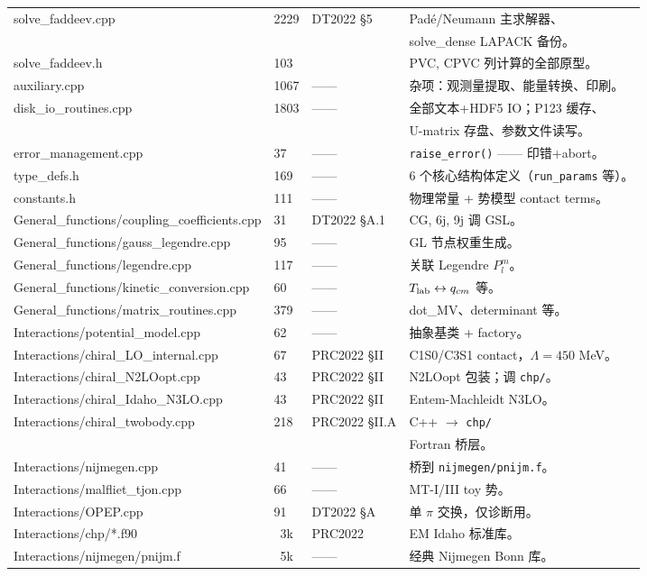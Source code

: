\begin{longtable}{p{3.6cm}p{1.0cm}p{2.4cm}p{6cm}}
solve\_faddeev.cpp             & 2229 & DT2022 §5    & Padé/Neumann 主求解器、\\
                               &      &              & solve\_dense LAPACK 备份。 \\
solve\_faddeev.h               & 103  &              & PVC, CPVC 列计算的全部原型。 \\
auxiliary.cpp                  & 1067 & ——           & 杂项：观测量提取、能量转换、印刷。\\
disk\_io\_routines.cpp         & 1803 & ——           & 全部文本+HDF5 IO；P123 缓存、\\
                               &      &              & U-matrix 存盘、参数文件读写。 \\
error\_management.cpp          & 37   & ——           & \texttt{raise\_error()} —— 印错+abort。 \\
type\_defs.h                   & 169  & ——           & 6 个核心结构体定义（\texttt{run\_params} 等）。 \\
constants.h                    & 111  & ——           & 物理常量 + 势模型 contact terms。 \\
General\_functions/coupling\_coefficients.cpp & 31   & DT2022 §A.1 & CG, 6j, 9j 调 GSL。 \\
General\_functions/gauss\_legendre.cpp        & 95   & ——          & GL 节点权重生成。 \\
General\_functions/legendre.cpp               & 117  & ——          & 关联 Legendre $P_l^m$。 \\
General\_functions/kinetic\_conversion.cpp    & 60   & ——          & ${T_{\text{lab}}} \leftrightarrow q_{cm}$ 等。 \\
General\_functions/matrix\_routines.cpp       & 379  & ——          & dot\_MV、determinant 等。 \\
Interactions/potential\_model.cpp & 62  & ——          & 抽象基类 + factory。 \\
Interactions/chiral\_LO\_internal.cpp & 67 & PRC2022 §II  & C1S0/C3S1 contact，$\Lambda=450$ MeV。 \\
Interactions/chiral\_N2LOopt.cpp & 43 & PRC2022 §II   & N2LOopt 包装；调 \texttt{chp/}。 \\
Interactions/chiral\_Idaho\_N3LO.cpp & 43 & PRC2022 §II & Entem-Machleidt N3LO。 \\
Interactions/chiral\_twobody.cpp & 218 & PRC2022 §II.A & C++ $\rightarrow$ \texttt{chp/}\\
                                  &     &               & Fortran 桥层。 \\
Interactions/nijmegen.cpp        & 41 & ——          & 桥到 \texttt{nijmegen/pnijm.f}。 \\
Interactions/malfliet\_tjon.cpp  & 66 & ——          & MT-I/III toy 势。 \\
Interactions/OPEP.cpp            & 91 & DT2022 §A    & 单 $\pi$ 交换，仅诊断用。 \\
Interactions/chp/*.f90           & ~3k & PRC2022     & EM Idaho 标准库。 \\
Interactions/nijmegen/pnijm.f    & ~5k & ——          & 经典 Nijmegen Bonn 库。\\
\bottomrule
\end{longtable}

